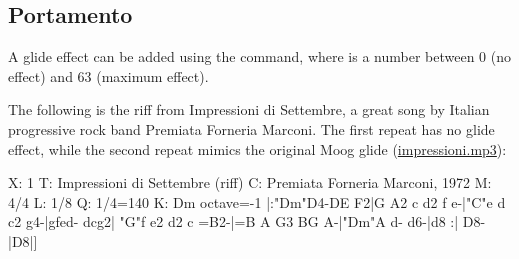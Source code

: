 \documentclass[a4paper,12pt]{book}
\begin{document}









\subsection{Portamento}
\label{sec:portamento}

A glide effect can be added using the  command, where  is a
number between 0 (no effect) and 63 (maximum effect). %

The following is the riff from Impressioni di Settembre, a great song
by Italian progressive rock band Premiata Forneria Marconi. The first
repeat has no glide effect, while the second repeat mimics the
original Moog glide (\href{run:impressioni.mp3}{impressioni.mp3}):

\begin{abcsource}
X: 1
T: Impressioni di Settembre (riff)
C: Premiata Forneria Marconi, 1972
M: 4/4
L: 1/8
Q: 1/4=140
K: Dm octave=-1
%
%
|:"Dm"D4-DE F2|G A2 c d2 f e-|"C"e d c2 g4-|gfed- dcg2|
"G"f e2 d2 c =B2-|=B A G3 BG A-|"Dm"A d- d6-|d8
:|
D8-|D8|]
\end{abcsource}
\end{document}
